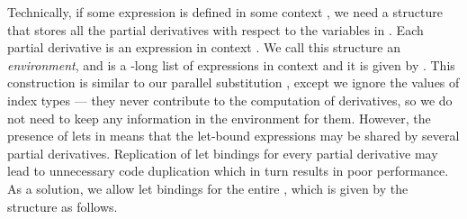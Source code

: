 Technically, if some expression  is defined in some context ,
we need a structure that stores all the partial derivatives with respect
to the variables in .  Each partial
derivative is an expression  in context .  We call this
structure an \emph{environment}, and is a -long list of expressions
in context  and it is given by .
This  construction is
similar to our parallel substitution , except we ignore the values of index
types --- they never contribute to the computation of derivatives, so we do not need to
keep any information in the environment for them.  However, the presence of lets in 
means that the let-bound expressions may be shared by several partial derivatives.
Replication of let bindings for every partial derivative
may lead to unnecessary code duplication which in turn results in
poor performance.  As a solution, we allow let bindings for the entire ,
which is given by the  structure as follows.
